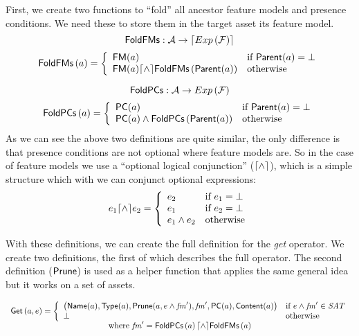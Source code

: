 First, we create two functions to ``fold'' all ancestor feature models and
presence conditions. We need these to store them in the target asset its
feature model.
\[
  {\sf FoldFMs} : \mathcal{A} \rightarrow \lceil Exp \left( \mathcal{F} \right) \rceil
\]
\[
  {\sf FoldFMs}\left(a\right) =
  \left\{
    \begin{array}{ll}
      {\sf FM}(a) & \text{if } {\sf Parent}(a) = \bot \\
      {\sf FM}(a) \lceil \land \rceil {\sf FoldFMs}\left( {\sf Parent}(a) \right) & \text{otherwise}
    \end{array}
  \right.
\]

\[
  {\sf FoldPCs} : \mathcal{A} \rightarrow Exp \left( \mathcal{F} \right)
\]
\[
  {\sf FoldPCs}\left(a\right) =
  \left\{
    \begin{array}{ll}
      {\sf PC}(a) & \text{if } {\sf Parent}(a) = \bot \\
      {\sf PC}(a) \land {\sf FoldPCs}\left( {\sf Parent}(a) \right) & \text{otherwise}
    \end{array}
  \right.
\]
As we can see the above two definitions are quite similar, the only difference
is that presence conditions are not optional where feature models are. So in
the case of feature models we use a ``optional logical conjunction'' 
(\(\lceil \land \rceil\)), which is a simple structure which with we can conjunct
optional expressions:
\[
  e_1 \lceil \land \rceil e_2 =
  \left\{
    \begin{array}{ll}
      e_2 & \text{if } e_1 = \bot \\
      e_1 & \text{if } e_2 = \bot \\
      e_1 \land e_2 & \text{otherwise}
    \end{array}
  \right.
\]

With these definitions, we can create the full definition for the \emph{get}
operator. We create two definitions, the first of which describes the full
operator. The second definition (\({\sf Prune}\)) is used as a helper
function that applies the same general idea but it works on a set of assets.

\[
  \begin{array}{c}
    {\sf Get}\left( a, e \right) = 
      \left\{
        \begin{array}{ll}
          \left( {\sf Name}(a), {\sf Type}(a), {\sf Prune}(a, e \land \mathit{fm}'), \mathit{fm}', {\sf PC}(a), {\sf Content}(a) \right) & \text{if } e \land \mathit{fm}' \in \textit{SAT} \\
          \bot & \text{otherwise}
        \end{array}
      \right. \\
      \text{where }\mathit{fm}' = {\sf FoldPCs}\left(a\right) \lceil \land \rceil {\sf FoldFMs}\left(a\right)
  \end{array}
\]

